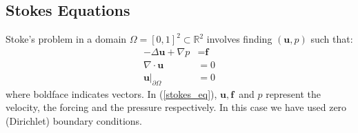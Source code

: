 \documentclass[12pt,a4paper]{article}
\theoremstyle{definition}
\begin{document}
\subsection{Stokes Equations}
Stoke's problem in a domain $\Omega = \left[0,1\right]^2 \subset \mathbb{R}^2$ involves finding $\left(\textbf{u},p\right)$ such that:
\begin{equation}\label{stokes_eq}
\begin{aligned}
	-\Delta\textbf{u} + \nabla p &= \textbf{f} \\ 
	\nabla\cdot \textbf{u}&= 0\\ 
\textbf{u}|_{\partial\Omega}&=0 
\end{aligned}
\end{equation}
where boldface indicates vectors.  In (\ref{stokes_eq}), $\textbf{u},\, \textbf{f}$ and $p$ represent the velocity, the forcing and the pressure respectively.  In this case we have used zero (Dirichlet) boundary conditions. 
\end{document}
